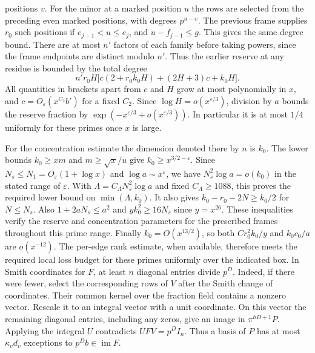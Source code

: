 \documentclass[11pt]{amsart}
\theoremstyle{definition}
\theoremstyle{remark}
\begin{document}
positions $v$. For the minor at a marked position $u$ the rows
are selected from the preceding even marked positions, with
degrees $p^{u-v}$. The previous frame supplies $r_0$ such
positions if $e_{j-1}<u\le e_j$, and
$u-f_{j-1}\le g$. This gives the same degree bound.
There are at most $n'$ factors of each family before taking powers,
since the frame endpoints are distinct modulo $n'$. Thus the
earlier reserve at any residue is bounded by the total degree
\[
 n'r_0H\big[c(2+r_0k_0H)+(2H+3)c+k_0H\big].
\]
All quantities in brackets apart from $c$ and $H$ grow at most
polynomially in $x$, and $c=O_\varepsilon(x^{C_2}b')$ for a
fixed $C_2$. Since $\log H=o(x^{\varepsilon/3})$, division by
$a$ bounds the reserve fraction by
$\exp(-x^{\varepsilon/3}+o(x^{\varepsilon/3}))$. In particular
it is at most $1/4$ uniformly for these primes once $x$ is large.

For the concentration estimate the dimension denoted there by
$n$ is $k_0$. The lower bounds $k_0\ge xm$ and
$m\ge\sqrt{x}/u$ give $k_0\ge x^{3/2-\varepsilon}$.
Since $N_s\le N_1=O_\varepsilon(1+\log x)$ and
$\log a\sim x^\varepsilon$, we have
$N_s^2\log a=o(k_0)$ in the stated range of $\varepsilon$.
With $\Lambda=C_\Lambda N_s^2\log a$ and fixed
$C_\Lambda\ge1088$, this proves the required lower bound on
$\min(\Lambda,k_0)$. It also gives $k_0-r_0-2N\ge k_0/2$
for $N\le N_s$. Also $1+2aN_s\le a^2$ and
$yk_0^2\ge16N_s$ since $y=x^{26}$. These inequalities verify the reserve
and concentration parameters for the prescribed frames throughout
this prime range.
Finally $k_0=O(x^{13/2})$, so both $Cr_0^2 k_0/y$ and $k_0c_0/a$
are $o(x^{-12})$. The per-edge rank estimate, when available,
therefore meets the required local loss budget for these primes
uniformly over the indicated box.
In Smith coordinates for $F$, at least $n$ diagonal entries divide
$p^D$. Indeed, if there were fewer, select the corresponding rows
of $V$ after the Smith change of coordinates. Their common kernel
over the fraction field contains a nonzero vector. Rescale it to
an integral vector with a unit coordinate. On this vector the
remaining diagonal entries, including any zeros, give an image in
$\pi^{hD+1}P$. Applying the integral $U$ contradicts
$UFV=p^D I_n$. Thus a basis of $P$ has at most $\kappa_v d_v$
exceptions to $p^D b\in\operatorname{im} F$.
\end{document}
